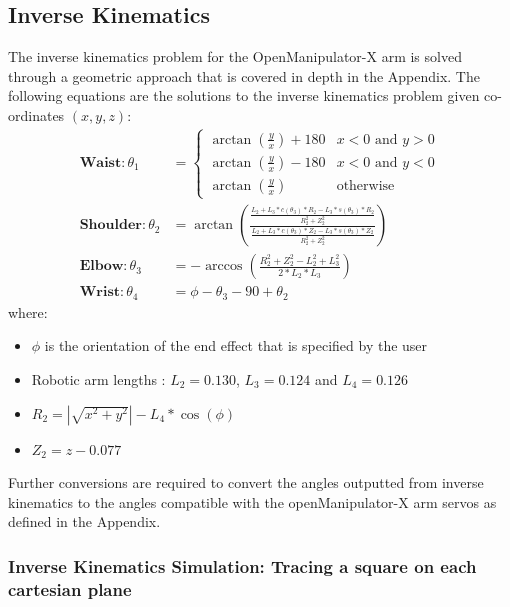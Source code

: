 \documentclass[9pt, a4paper]{article}
\begin{document}
\subsection{Inverse Kinematics}
The inverse kinematics problem for the OpenManipulator-X arm is solved through a
geometric approach that is covered in depth in the Appendix. The following
equations are the solutions to the inverse kinematics problem given co-ordinates
$(x, y, z)$:
\begin{align*}
    \textbf{Waist}: \theta_1 &= \begin{cases} 
        \arctan(\frac{y}{x}) + 180 & x < 0 \text{ and } y > 0 \\ 
        \arctan(\frac{y}{x}) - 180 & x < 0 \text{ and } y < 0 \\
        \arctan(\frac{y}{x}) & \text{otherwise}
    \end{cases} \\
    \textbf{Shoulder}: \theta_2 &= \arctan\left(\frac{\frac{L_2 + L_3*c(\theta_3)*R_2 - L_3*s(\theta_3)*R_2}{R_2^2 + Z_2^2}}{\frac{L_2 + L_3*c(\theta_3)*Z_2 - L_3*s(\theta_3)*Z_2}{R_2^2 + Z_2^2}}\right) \\ 
    \textbf{Elbow}: \theta_3 &= -\arccos\left(\frac{R_2^2 + Z_2^2 - L_2^2 + L_3^2}{2*L_2*L_3}\right)\\ 
    \textbf{Wrist}: \theta_4 &= \phi - \theta_3 - 90 + \theta_2 
\end{align*}
where: 
\begin{itemize}
    \item $\phi$ is the orientation of the end effect that is specified by the user
    \item Robotic arm lengths \cite{CAD_model}: $L_2 = 0.130$, $L_3 = 0.124$ and $L_4 = 0.126$
    \item $R_2 = |\sqrt{x^2 + y^2}| - L_4*\cos(\phi)$
    \item $Z_2 = z - 0.077$
\end{itemize}

Further conversions are required to convert the angles outputted from inverse
kinematics to the angles compatible with the openManipulator-X arm servos as
defined in the Appendix.

\subsubsection{Inverse Kinematics Simulation: Tracing a square on each cartesian plane}
\end{document}
